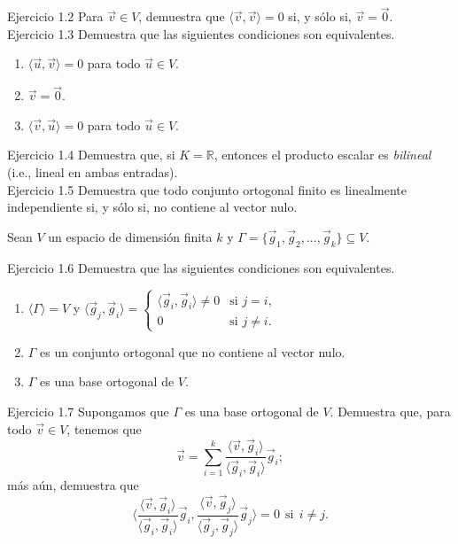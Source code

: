 \documentclass[12pt,dvipsnames]{article}
\numberwithin{equation}{section}
\begin{document}
Ejercicio 1.2 Para $\vec{v}\in V$, demuestra que $\langle \vec{v} , \vec{v} \rangle = 0$ si, y sólo si, $\vec{v}=\vec{0}$. \\

Ejercicio 1.3 Demuestra que las siguientes condiciones son equivalentes. %

\begin{enumerate}[label=(\alph*)]
    \item $\langle \vec{u} , \vec{v} \rangle = 0$ para todo $\vec{u}\in V$.

    \item $\vec{v}=\vec{0}$.

    \item $\langle \vec{v} , \vec{u} \rangle = 0$ para todo $\vec{u}\in V$.
\end{enumerate}

Ejercicio 1.4 Demuestra que, si $K=\mathbb{R}$, entonces el producto escalar es \emph{bilineal} (i.e., lineal en ambas entradas). \\

Ejercicio 1.5 Demuestra que todo conjunto ortogonal finito es linealmente independiente si, y sólo si, no contiene al vector nulo. \\

\begin{center}
Sean $V$ un espacio de dimensión finita $k$ y $\Gamma=\{\vec{g}_1,\vec{g}_2,...,\vec{g}_k\}\subseteq V$.
\end{center}

Ejercicio 1.6 Demuestra que las siguientes condiciones son equivalentes. 

\begin{enumerate}[label=(\alph*)]
    \item $\langle \Gamma \rangle = V$ y $\langle \vec{g}_j , \vec{g}_i \rangle = \begin{cases} \langle \vec{g}_i , \vec{g}_i \rangle \neq 0 &\text{si } j=i, \\ 0 &\text{si } j \neq i. \end{cases}$

    \item $\Gamma$ es un conjunto ortogonal que no contiene al vector nulo.

    \item $\Gamma$ es una base ortogonal de $V$.
\end{enumerate} 

Ejercicio 1.7 Supongamos que $\Gamma$ es una base ortogonal de $V$. Demuestra que, para todo $\vec{v}\in V$, tenemos que
\[
    \vec{v} = \sum_{i=1}^k \frac{\langle \vec{v} , \vec{g}_i \rangle}{\langle \vec{g}_i , \vec{g}_i \rangle} \vec{g}_i;
\] 
\noindent más aún, demuestra que
\[
\bigg\langle \frac{\langle \vec{v} , \vec{g}_i \rangle}{\langle \vec{g}_i , \vec{g}_i \rangle} \vec{g}_i, \frac{\langle \vec{v} , \vec{g}_j \rangle}{\langle \vec{g}_j , \vec{g}_j \rangle} \vec{g}_j \bigg \rangle = 0 \ \ \text{si} \ \ i\neq j.
\] 
\end{document}
